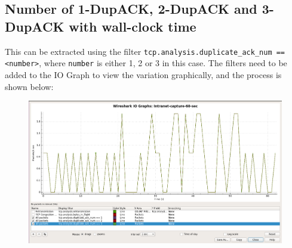 \documentclass{article}
\begin{document}
\subsection{Number of 1-DupACK, 2-DupACK and 3-DupACK with wall-clock time}
\begin{flushleft}
This can be extracted using the filter \texttt{tcp.analysis.duplicate\_ack\_num == <number>}, where \texttt{number} is either 1, 2 or 3 in this case. The filters need to be added to the IO Graph to view the variation graphically, and the process is shown below:
\begin{figure}[H]
\centering
\includegraphics[width=0.55\linewidth]{dup-ack-capture-process-Intranet.png}
\end{figure}


\end{flushleft}
\end{document}
